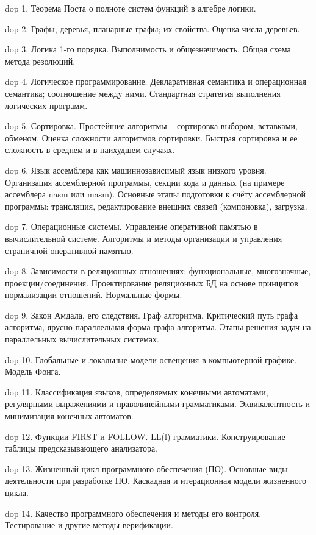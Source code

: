 dop 1. Теорема Поста о полноте систем функций в алгебре логики.

dop 2. Графы,  деревья,  планарные графы;  их свойства.  Оценка числа деревьев.

dop 3. Логика 1-го порядка.  Выполнимость и общезначимость. Общая схема метода резолюций.

dop 4. Логическое  программирование. Декларативная семантика и операционная семантика;  соотношение между ними.  Стандартная стратегия выполнения логических программ.

dop 5. Сортировка.  Простейшие  алгоритмы – сортировка  выбором,  вставками,  обменом.  Оценка  сложности алгоритмов сортировки. Быстрая сортировка и ее сложность в среднем и в наихудшем случаях.

dop 6. Язык  ассемблера  как  машиннозависимый  язык  низкого  уровня.  Организация  ассемблерной  программы, секции кода и данных (на примере ассемблера nasm или masm). Основные  этапы подготовки к счёту ассемблерной программы: трансляция, редактирование внешних связей (компоновка), загрузка.

dop 7. Операционные системы. Управление оперативной памятью в вычислительной системе. Алгоритмы и методы организации и управления страничной оперативной памятью.

dop 8. Зависимости  в  реляционных  отношениях:  функциональные,  многозначные,  проекции/соединения. Проектирование реляционных БД на основе принципов нормализации отношений. Нормальные формы.

dop 9. Закон Амдала, его следствия. Граф алгоритма. Критический путь графа алгоритма, ярусно-параллельная форма графа алгоритма. Этапы решения задач на параллельных вычислительных системах.

dop 10. Глобальные и локальные модели освещения в компьютерной графике. Модель Фонга.

dop 11. Классификация  языков,  определяемых  конечными  автоматами,  регулярными  выражениями  и праволинейными грамматиками. Эквивалентность и минимизация конечных автоматов.

dop 12. Функции FIRST и FOLLOW. LL(l)-грамматики. Конструирование таблицы предсказывающего анализатора.

dop 13. Жизненный  цикл  программного  обеспечения  (ПО).  Основные  виды  деятельности  при  разработке  ПО. Каскадная и итерационная модели жизненного цикла.

dop 14. Качество программного обеспечения и методы его контроля. Тестирование и другие методы верификации.

